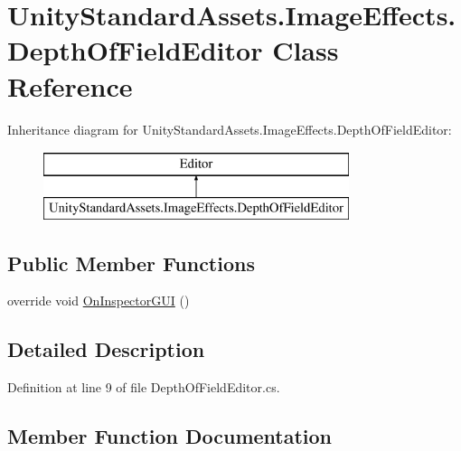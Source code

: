 \hypertarget{class_unity_standard_assets_1_1_image_effects_1_1_depth_of_field_editor}{}\section{Unity\+Standard\+Assets.\+Image\+Effects.\+Depth\+Of\+Field\+Editor Class Reference}
\label{class_unity_standard_assets_1_1_image_effects_1_1_depth_of_field_editor}
Inheritance diagram for Unity\+Standard\+Assets.\+Image\+Effects.\+Depth\+Of\+Field\+Editor\+:\begin{figure}[H]
\begin{center}
\leavevmode
\includegraphics[height=2.000000cm]{class_unity_standard_assets_1_1_image_effects_1_1_depth_of_field_editor}
\end{center}
\end{figure}
\subsection*{Public Member Functions}
\begin{DoxyCompactItemize}
\item 
override void \mbox{\hyperlink{class_unity_standard_assets_1_1_image_effects_1_1_depth_of_field_editor_a0c0af7cbf885a09a9daae688d899630c}{On\+Inspector\+G\+UI}} ()
\end{DoxyCompactItemize}


\subsection{Detailed Description}


Definition at line 9 of file Depth\+Of\+Field\+Editor.\+cs.



\subsection{Member Function Documentation}
\mbox{\label{class_unity_standard_assets_1_1_image_effects_1_1_depth_of_field_editor_a0c0af7cbf885a09a9daae688d899630c}} 
